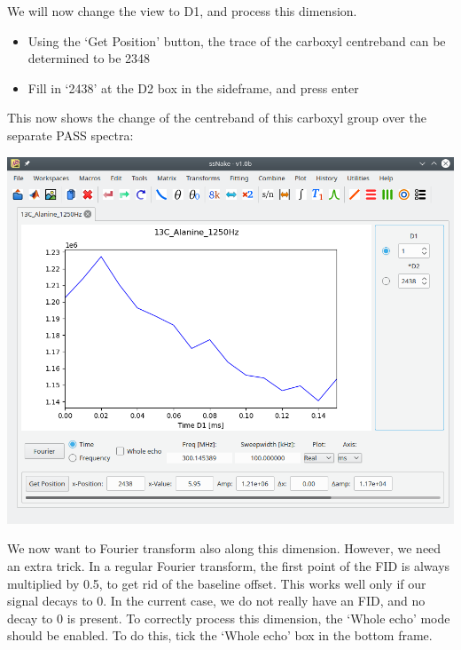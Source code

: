 \documentclass[11pt,a4paper]{article}
\begin{document}
We will now change the view to D1, and process this dimension.
\begin{itemize}
  \item Using the `Get Position' button, the trace of the carboxyl centreband can be determined to be 2348
  \item Fill in `2438' at the D2 box in the sideframe, and press enter
\end{itemize}
This now shows the change of the centreband of this carboxyl group over the separate PASS spectra:
\begin{center}
\includegraphics[width=0.8\linewidth]{Figs/Fig2.png}
\end{center}
We now want to Fourier transform also along this dimension. However, we need an extra trick. In a
regular Fourier transform, the first point of the FID is always multiplied by 0.5, to get rid of the baseline offset.
This works well only if our signal decays to 0. In the current case, we do not really have an FID, and no decay to 0 is present.
To correctly process this dimension, the `Whole echo' mode should be enabled.
To do this, tick the `Whole echo' box in the bottom frame.
\end{document}
